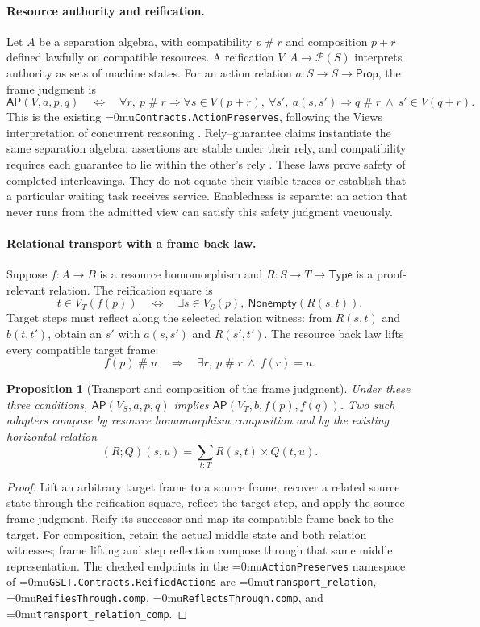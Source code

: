 \documentclass[11pt]{article}
\newcommand{\leanname}[1]{\textup{\Urlmuskip=0mu\relax\nolinkurl{#1}}}
\newtheorem{proposition}[theorem]{Proposition}
\theoremstyle{definition}
\theoremstyle{remark}
\begin{document}
\paragraph{Resource authority and reification.}
Let $A$ be a separation algebra, with compatibility $p\mathbin{\#}r$ and
composition $p+r$ defined lawfully on compatible resources. A reification
$V:A\to\mathcal P(S)$ interprets authority as sets of machine states.
For an action relation $a:S\to S\to\mathsf{Prop}$, the frame judgment is
\[
  \mathsf{AP}(V,a,p,q)
  \quad\Longleftrightarrow\quad
  \forall r,\ p\mathbin{\#}r\Rightarrow
  \forall s\in V(p+r),\ \forall s',\
  a(s,s')\Rightarrow
  q\mathbin{\#}r\ \land\ s'\in V(q+r).
\]
This is the existing \leanname{Contracts.ActionPreserves}, following the
Views interpretation of concurrent reasoning
\cite{DinsdaleYoungViews}. Rely--guarantee claims instantiate the same
separation algebra: assertions are stable under their rely, and compatibility
requires each guarantee to lie within the other's rely
\cite{JonesInterferingPrograms}. These laws prove safety of completed
interleavings. They do not equate their visible traces or establish that a
particular waiting task receives service. Enabledness is separate: an action
that never runs from the admitted view can satisfy this safety judgment
vacuously.

\paragraph{Relational transport with a frame back law.}
Suppose $f:A\to B$ is a resource homomorphism and
$R:S\to T\to\mathsf{Type}$ is a proof-relevant relation. The reification square
is
\[
  t\in V_T(f(p))
  \quad\Longleftrightarrow\quad
  \exists s\in V_S(p),\ \mathsf{Nonempty}(R(s,t)).
\]
Target steps must reflect along the selected relation witness: from
$R(s,t)$ and $b(t,t')$, obtain an $s'$ with $a(s,s')$ and $R(s',t')$.
The resource back law lifts every compatible target frame:
\[
  f(p)\mathbin{\#}u
  \quad\Longrightarrow\quad
  \exists r,\ p\mathbin{\#}r\ \land\ f(r)=u.
\]
\begin{proposition}[Transport and composition of the frame judgment]
Under these three conditions, $\mathsf{AP}(V_S,a,p,q)$ implies
$\mathsf{AP}(V_T,b,f(p),f(q))$. Two such adapters compose by resource
homomorphism composition and by the existing horizontal relation
\[
  (R;Q)(s,u)=\sum_{t:T}R(s,t)\times Q(t,u).
\]
\end{proposition}
\begin{proof}
Lift an arbitrary target frame to a source frame, recover a related source
state through the reification square, reflect the target step, and apply the
source frame judgment. Reify its successor and map its compatible frame
back to the target. For composition, retain the actual middle state and both
relation witnesses; frame lifting and step reflection compose through that
same middle representation. The checked endpoints in the
\leanname{ActionPreserves} namespace of
\leanname{GSLT.Contracts.ReifiedActions} are
\leanname{transport_relation},
\leanname{ReifiesThrough.comp},
\leanname{ReflectsThrough.comp}, and
\leanname{transport_relation_comp}.
\end{proof}
\end{document}
